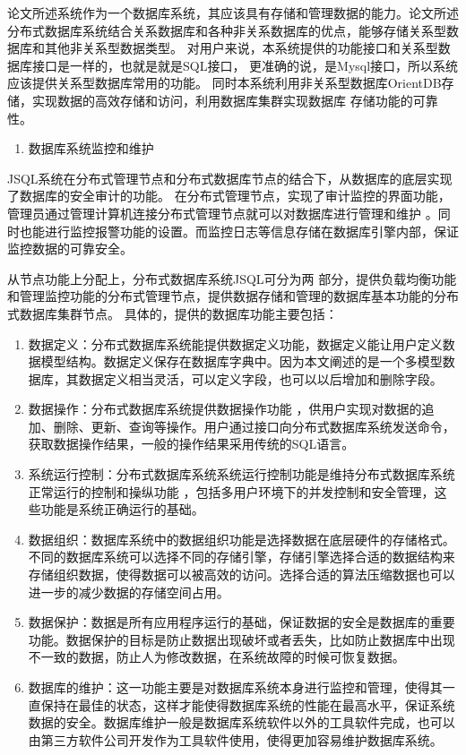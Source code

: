 	论文所述系统作为一个数据库系统，其应该具有存储和管理数据的能力。论文所述分布式数据库系统结合关系数据库和各种非关系数据库的优点，能够存储关系型数据库和其他非关系型数据类型。
	对用户来说，本系统提供的功能接口和关系型数据库接口是一样的，也就是就是SQL接口，
	更准确的说，是Mysql接口，所以系统应该提供关系型数据库常用的功能。
	同时本系统利用非关系型数据库OrientDB存储，实现数据的高效存储和访问，利用数据库集群实现数据库
	存储功能的可靠性。
	
	\begin{enumerate}[resume]
		\item 数据库系统监控和维护
	\end{enumerate}

	JSQL系统在分布式管理节点和分布式数据库节点的结合下，从数据库的底层实现了数据库的安全审计的功能。
	在分布式管理节点，实现了审计监控的界面功能，管理员通过管理计算机连接分布式管理节点就可以对数据库进行管理和维护
	。同时也能进行监控报警功能的设置。而监控日志等信息存储在数据库引擎内部，保证监控数据的可靠安全。


	从节点功能上分配上，分布式数据库系统JSQL可分为两
	部分，提供负载均衡功能和管理监控功能的分布式管理节点，提供数据存储和管理的数据库基本功能的分布式数据库集群节点。
具体的，提供的数据库功能主要包括：
\begin{enumerate}[fullwidth,itemindent=2em,listparindent=2em]
	\item 数据定义：分布式数据库系统能提供数据定义功能，数据定义能让用户定义数据模型结构。数据定义保存在数据库字典中。因为本文阐述的是一个多模型数据库，其数据定义相当灵活，可以定义字段，也可以以后增加和删除字段。
	\item 数据操作：分布式数据库系统提供数据操作功能
	，供用户实现对数据的追加、删除、更新、查询等操作。用户通过接口向分布式数据库系统发送命令，获取数据操作结果，一般的操作结果采用传统的SQL语言。
	\item 系统运行控制：分布式数据库系统系统运行控制功能是维持分布式数据库系统正常运行的控制和操纵功能
	，包括多用户环境下的并发控制和安全管理，这些功能是系统正确运行的基础。
	\item 数据组织：数据库系统中的数据组织功能是选择数据在底层硬件的存储格式。
	不同的数据库系统可以选择不同的存储引擎，存储引擎选择合适的数据结构来存储组织数据，使得数据可以被高效的访问。选择合适的算法压缩数据也可以进一步的减少数据的存储空间占用。
	\item   数据保护：数据是所有应用程序运行的基础，保证数据的安全是数据库的重要功能。数据保护的目标是防止数据出现破坏或者丢失，比如防止数据库中出现不一致的数据，防止人为修改数据，在系统故障的时候可恢复数据。
	\item  数据库的维护：这一功能主要是对数据库系统本身进行监控和管理，使得其一直保持在最佳的状态，这样才能使得数据库系统的性能在最高水平，保证系统数据的安全。数据库维护一般是数据库系统软件以外的工具软件完成，也可以由第三方软件公司开发作为工具软件使用，使得更加容易维护数据库系统。
\end{enumerate}
